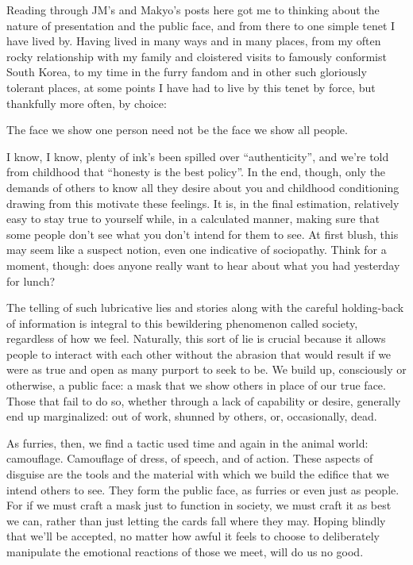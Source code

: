 
Reading through JM's and Makyo's posts here got me to thinking about the nature of presentation and the public face, and from there to one simple tenet I have lived by. Having lived in many ways and in many places, from my often rocky relationship with my family and cloistered visits to famously conformist South Korea, to my time in the furry fandom and in other such gloriously tolerant places, at some points I have had to live by this tenet by force, but thankfully more often, by choice:

The face we show one person need not be the face we show all people.

I know, I know, plenty of ink's been spilled over ``authenticity'', and we're told from childhood that ``honesty is the best policy''. In the end, though, only the demands of others to know all they desire about you and childhood conditioning drawing from this motivate these feelings. It is, in the final estimation, relatively easy to stay true to yourself while, in a calculated manner, making sure that some people don't see what you don't intend for them to see. At first blush, this may seem like a suspect notion, even one indicative of sociopathy. Think for a moment, though: does anyone really want to hear about what you had yesterday for lunch?

The telling of such lubricative lies and stories along with the careful holding-back of information is integral to this bewildering phenomenon called society, regardless of how we feel. Naturally, this sort of lie is crucial because it allows people to interact with each other without the abrasion that would result if we were as true and open as many purport to seek to be. We build up, consciously or otherwise, a public face: a mask that we show others in place of our true face. Those that fail to do so, whether through a lack of capability or desire, generally end up marginalized: out of work, shunned by others, or, occasionally, dead.

As furries, then, we find a tactic used time and again in the animal world: camouflage. Camouflage of dress, of speech, and of action. These aspects of disguise are the tools and the material with which we build the edifice that we intend others to see. They form the public face, as furries or even just as people. For if we must craft a mask just to function in society, we must craft it as best we can, rather than just letting the cards fall where they may. Hoping blindly that we'll be accepted, no matter how awful it feels to choose to deliberately manipulate the emotional reactions of those we meet, will do us no good.

